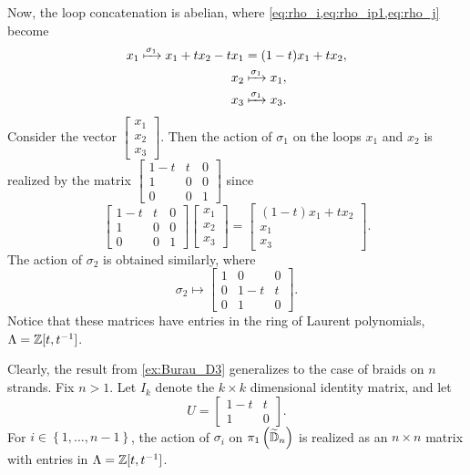 \begin{example}
    Now, the loop concatenation is abelian, where \cref{eq:rho_i,eq:rho_ip1,eq:rho_j} become
    \begin{align}
        x_1 \xmapsto{\sigma_1} x_1 + tx_2 - tx_1 &= (1-t)x_1 + tx_2, \\
        x_{2} &\xmapsto{\sigma_1} x_1, \\
        x_3 &\xmapsto{\sigma_1} x_3.
    \end{align}
    Consider the vector $\begin{bmatrix}
        x_1 \\ x_2 \\ x_3
    \end{bmatrix}$. Then the action of $\sigma_1$ on the loops $x_1$ and $x_2$ is realized by the matrix $\begin{bmatrix}
        1-t & t & 0 \\ 1 & 0 & 0 \\ 0 & 0 & 1
    \end{bmatrix}$ since
    \begin{equation}
        \begin{bmatrix}
            1-t & t & 0 \\ 1 & 0 & 0 \\ 0 & 0 & 1
        \end{bmatrix}\begin{bmatrix}
            x_1 \\ x_2 \\ x_3
        \end{bmatrix} = \begin{bmatrix}
            (1-t)x_1 + tx_2 \\ x_1 \\ x_3
        \end{bmatrix}.
    \end{equation}
    The action of $\sigma_2$ is obtained similarly, where
    \begin{equation}
        \sigma_2 \mapsto \begin{bmatrix}
            1 & 0 & 0 \\ 0 & 1-t & t \\ 0 & 1 & 0
        \end{bmatrix}.
    \end{equation}
    Notice that these matrices have entries in the ring of Laurent polynomials, $\Lambda=\mathbb{Z}[t,{ t }^{-1}]$.
\end{example}

Clearly, the result from \cref{ex:Burau_D3} generalizes to the case of braids on $n$ strands. Fix $n>1$. Let $I_k$ denote the $k\times k$ dimensional identity matrix, and let
\begin{equation}
    U=\begin{bmatrix}
        1-t & t \\ 1 & 0
    \end{bmatrix}.
\end{equation} 
For $i\in\left\{ 1,\dots,n-1 \right\}$, the action of $\sigma_i$ on $\pi_1\left( \widetilde{\mathbb{D}}_n \right)$ is realized as an $n\times n$ matrix with entries in $\Lambda = \mathbb{Z}[t,{ t }^{-1}]$. 

